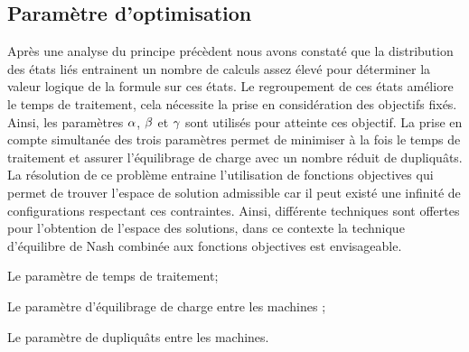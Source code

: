 
\subsection{Paramètre d’optimisation}
 
Après une analyse du principe précèdent nous avons constaté que la distribution des états liés entrainent un nombre de calculs assez élevé pour déterminer la valeur logique de la formule sur ces états. Le regroupement de ces états améliore le temps de traitement, cela nécessite la prise en considération des objectifs fixés. Ainsi, les paramètres $\parametreone{}$, $\parametretwo{}$ et $\parametretree{}$ sont utilisés pour atteinte ces objectif. La prise en compte simultanée des trois paramètres permet de minimiser à la fois le temps de traitement et assurer l’équilibrage de charge avec un nombre réduit de dupliquâts. La résolution de ce problème entraine l'utilisation de fonctions objectives qui permet de trouver l'espace de solution admissible car il peut existé une infinité de configurations respectant ces contraintes. Ainsi, différente techniques sont offertes pour l'obtention de l'espace des solutions, dans ce contexte la technique d’équilibre de Nash combinée aux fonctions objectives est envisageable.
\begin{description}[leftmargin=*,labelindent=1em]
	\item[$\parametreone{}$] Le paramètre de temps de traitement;
	\item [$\parametretwo{}$] Le paramètre d'équilibrage de charge entre les machines ;
	\item [$\parametretree{}$] Le paramètre de dupliquâts  entre les machines.
\end{description}


